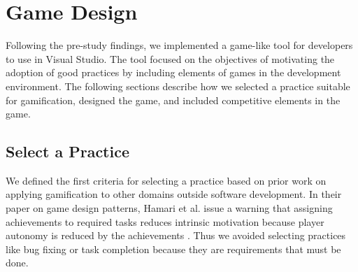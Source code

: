 \documentclass{sig-alternate}
\begin{document}
\section{Game Design}



Following the pre-study findings, we implemented a game-like tool for developers to use in Visual Studio.  The tool focused on the objectives of motivating the adoption of good practices by including elements of games in the development environment.  The following sections describe how we selected a practice suitable for gamification, designed the game, and included competitive elements in the game.

\subsection{Select a Practice}

We defined the first criteria for selecting a practice based on prior work on applying gamification to other domains outside software development. 
In their paper on game design patterns, Hamari et al. issue a warning that assigning achievements to required tasks reduces intrinsic motivation because player autonomy is reduced by the achievements \cite{wbsnipes:Hamari2011Framework} .  Thus we avoided selecting practices like bug fixing or task completion because they are requirements that must be done.  
\end{document}
